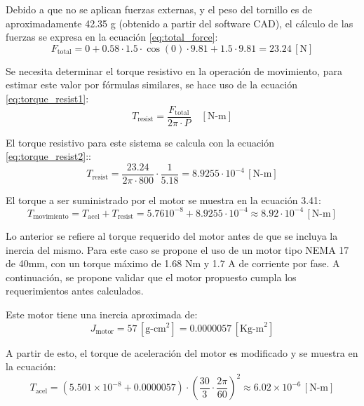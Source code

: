 \documentclass[14pt,oneside]{extarticle} %
\begin{document}
 Debido a que no se aplican fuerzas externas, y el peso del tornillo es de aproximadamente 42.35 g (obtenido a partir del software CAD), el cálculo de las fuerzas se expresa en la ecuación \ref{eq:total_force}:
\begin{equation}
F_{\text{total}} = 0 + 0.58 \cdot 1.5 \cdot \cos(0) \cdot 9.81 + 1.5 \cdot 9.81 = 23.24 \, [\text{N}]
\label{eq:total_force}
\end{equation}

 Se necesita determinar el torque resistivo en la operación de movimiento, para estimar este valor por fórmulas similares, se hace uso de la ecuación \ref{eq:torque_resist1}:
\begin{equation}
T_{\text{resist}} = \frac{F_{\text{total}}}{2\pi \cdot P} \quad [\text{N-m}]
\label{eq:torque_resist1}
\end{equation}

 El torque resistivo para este sistema se calcula con la ecuación \ref{eq:torque_resist2}::
\begin{equation}
T_{\text{resist}} = \frac{23.24}{2\pi \cdot 800} \cdot \frac{1}{5.18} = 8.9255 \cdot 10^{-4} \, [\text{N-m}]
\label{eq:torque_resist2}
\end{equation}

El torque a ser suministrado por el motor se muestra en la ecuación 3.41:
\begin{equation}
T_{\text{movimiento}} = T_{\text{acel}} + T_{\text{resist}} = 5.7610^{-8} + 8.9255 \cdot 10^{-4} \approx 8.92 \cdot 10^{-4} \, [\text{N-m}]
\label{eq:motor_torque}
\end{equation}

Lo anterior se refiere al torque requerido del motor antes de que se incluya la inercia del mismo. Para este caso se propone el uso de un motor tipo NEMA 17 de 40mm, con un torque máximo de 1.68 Nm y 1.7 A de corriente por fase. A continuación, se propone validar que el motor propuesto cumpla los requerimientos antes calculados.

Este motor tiene una inercia aproximada de:
\[
J_{\text{motor}} = 57 \, [\text{g-cm}^2] = 0.0000057 \, [\text{Kg-m}^2]
\]

A partir de esto, el torque de aceleración del motor es modificado y se muestra en la ecuación:
\begin{equation}
T_{\text{acel}} = \left(5.501 \times 10^{-8} + 0.0000057\right) \cdot \left(\frac{30}{3} \cdot \frac{2\pi}{60}\right)^2 \approx 6.02 \times 10^{-6} \, [\text{N-m}]
\label{eq:torque_acel}
\end{equation}
\end{document}
